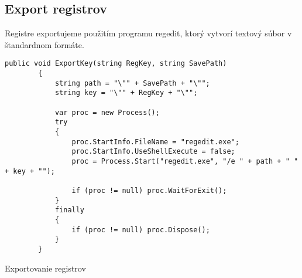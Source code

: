 \subsection{Export registrov}
Registre exportujeme použitím programu regedit, ktorý vytvorí textový súbor v štandardnom formáte.

\begin{listing}
\begin{verbatim}
public void ExportKey(string RegKey, string SavePath)
        {
            string path = "\"" + SavePath + "\"";
            string key = "\"" + RegKey + "\"";

            var proc = new Process();
            try
            {
                proc.StartInfo.FileName = "regedit.exe";
                proc.StartInfo.UseShellExecute = false;
                proc = Process.Start("regedit.exe", "/e " + path + " " + key + "");

                if (proc != null) proc.WaitForExit();
            }
            finally
            {
                if (proc != null) proc.Dispose();
            }
        }  
\end{verbatim}
\caption{Exportovanie registrov}
\label{lst:regexport}
\end{listing}

